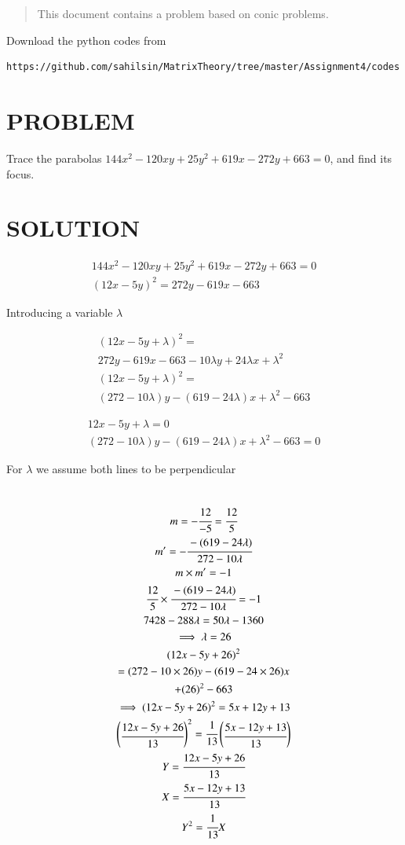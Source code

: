 \begin{abstract}
This document contains a problem based on conic problems.
\end{abstract}

Download the python codes from 
%
\begin{lstlisting}
https://github.com/sahilsin/MatrixTheory/tree/master/Assignment4/codes
\end{lstlisting}
%
\section{PROBLEM}
Trace the parabolas $144x^2-120xy+25y^2+619x-272y+663=0$, and find its focus. 

\section{SOLUTION}

\begin{align}
    144x^2-120xy+25y^2+619x-272y+663=0
\\
    (12x-5y)^2=272y-619x-663 
\end{align}

Introducing a variable $\lambda$

\begin{align}
    (12x-5y+\lambda)^2=
\\
    272y-619x-663-10\lambda y+24\lambda x+\lambda ^2
\\
    (12x-5y+\lambda)^2=
\\
    (272-10\lambda)y-(619-24\lambda)x+\lambda^2-663
\end{align}

\begin{align}
    12x-5y+\lambda=0
\\
    (272-10\lambda)y-(619-24\lambda)x+\lambda^2-663=0
\end{align}

For $\lambda$ we assume both lines to be perpendicular

\begin{multline}
\\
    m=-\cfrac{12}{-5}=\cfrac{12}{5}
\\
    m'=-\cfrac{-(619-24\lambda)}{272-10\lambda}
\\
    m \times m'= -1
\\
    \cfrac{12}{5} \times \cfrac{-(619-24\lambda)}{272-10\lambda}=-1
\\
    7428-288\lambda=50\lambda-1360
\\
    \implies \lambda = 26
\\
    (12x-5y+26)^2
\\
    =(272-10\times26)y-(619-24\times26)x
\\
    +(26)^2-663
\\
    \implies (12x-5y+26)^2=5x+12y+13
\\
    \begin{pmatrix}\cfrac{12x-5y+26}{13}\end{pmatrix}^2=\cfrac{1}{13}\begin{pmatrix}\cfrac{5x-12y+13}{13}\end{pmatrix}
\\
    Y=\cfrac{12x-5y+26}{13}
\\
    X=\cfrac{5x-12y+13}{13}
\\
    Y^2=\cfrac{1}{13}X
\end{multline}

